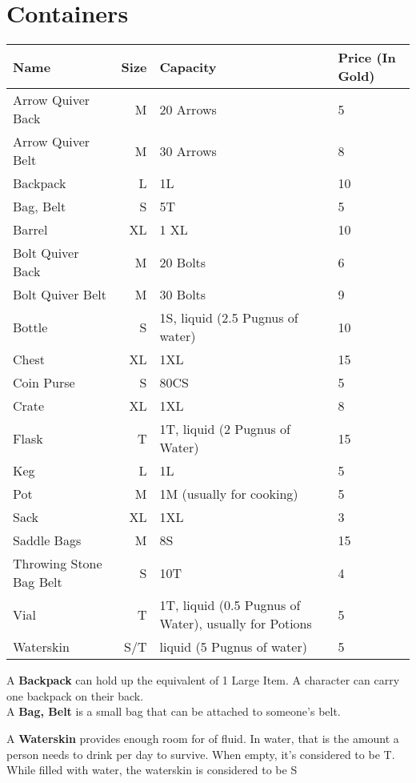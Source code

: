\section{Containers}\label{sec:containers}
\begin{longtable}{l | r | p{4.5cm} | p{1.5cm}}
	Name & Size & Capacity & Price (In Gold)\\ \hline
	Arrow Quiver Back & M & 20 Arrows & 5 \\
	Arrow Quiver Belt & M & 30 Arrows & 8 \\
	Backpack & L & 1L & 10 \\
	Bag, Belt & S & 5T & 5 \\
	Barrel & XL & 1 XL & 10 \\
	Bolt Quiver Back & M & 20 Bolts & 6 \\
	Bolt Quiver Belt & M & 30 Bolts & 9 \\
	Bottle & S & 1S, liquid (2.5 Pugnus of water) & 10 \\
	Chest & XL & 1XL & 15 \\
	Coin Purse & S & 80CS & 5 \\
	Crate & XL & 1XL & 8 \\
	Flask & T & 1T, liquid (2 Pugnus of Water) & 15 \\
	Keg & L & 1L & 5 \\
	Pot & M & 1M (usually for cooking) & 5 \\
	Sack & XL & 1XL & 3 \\
	Saddle Bags & M & 8S & 15 \\
	Throwing Stone Bag Belt & S & 10T & 4 \\
	Vial & T & 1T, liquid (0.5 Pugnus of Water), usually for Potions & 5 \\
	Waterskin & S/T & liquid (5 Pugnus of water) & 5 \\
\end{longtable}

A \textbf{Backpack} can hold up the equivalent of 1 Large Item.
A character can carry one backpack on their back.\\

A \textbf{Bag, Belt} is a small bag that can be attached to someone's belt.

A \textbf{Waterskin} provides enough room for  of fluid.
In water, that is the amount a person needs to drink per day to survive.
When empty, it's considered to be T.
While filled with water, the waterskin is considered to be S\\